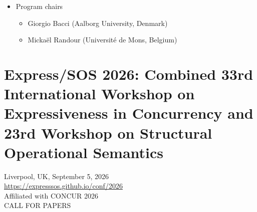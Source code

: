 \documentclass[prodmode,acmtecs]{acmsmall} %
\begin{document}
\begin{itemize}
\item  Program chairs  
 
\begin{itemize}\item  Giorgio Bacci (Aalborg University, Denmark)
\item  Mickaël Randour (Université de Mons, Belgium)
\end{itemize} 
\end{itemize}\section{Express/SOS 2026: Combined 33rd International Workshop on Expressiveness in Concurrency and 23rd Workshop on Structural Operational Semantics}\label{ExpressSOS2026}  Liverpool, UK, September 5, 2026\\ 
  \href{https://expresssos.github.io/conf/2026}{https://expresssos.github.io/conf/2026}\\ 
  Affiliated with CONCUR 2026\\ 
CALL FOR PAPERS 
\end{document}
